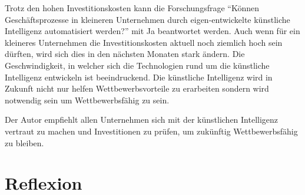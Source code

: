 Trotz den hohen Investitionskosten kann die Forschungsfrage \enquote{Können Geschäftsprozesse in kleineren Unternehmen durch eigen-entwickelte künstliche Intelligenz automatisiert werden?} mit Ja beantwortet werden. Auch wenn für ein kleineres Unternehmen die Investitionskosten aktuell noch ziemlich hoch sein dürften, wird sich dies in den nächsten Monaten stark ändern. Die Geschwindigkeit, in welcher sich die Technologien rund um die künstliche Intelligenz entwickeln ist beeindruckend. Die künstliche Intelligenz wird in Zukunft nicht nur helfen Wettbewerbsvorteile zu erarbeiten sondern wird notwendig sein um Wettbewerbsfähig zu sein.

Der Autor empfiehlt allen Unternehmen sich mit der künstlichen Intelligenz vertraut zu machen und Investitionen zu prüfen, um zukünftig Wettbewerbsfähig zu bleiben. 

\cleardoublepage
\section{Reflexion}
\label{chap:reflexion}

